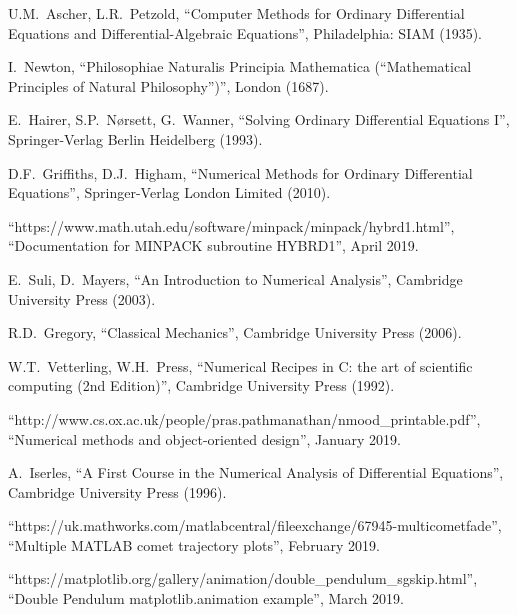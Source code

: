\documentclass[12pt, twoside]{report}
\theoremstyle{plain}
\theoremstyle{definition}
\theoremstyle{definition}
\begin{document}
\begin{thebibliography}{50}
        U.M.~Ascher, L.R.~Petzold,
        ``Computer Methods for Ordinary Differential Equations and 
        Differential-Algebraic Equations'',
        Philadelphia: SIAM (1935).

        I.~Newton,
        ``Philosophiae Naturalis Principia Mathematica (“Mathematical
        Principles of Natural Philosophy”)'',
        London (1687).

        E.~Hairer, S.P.~N{\o}rsett, G.~Wanner,
        ``Solving Ordinary Differential Equations I'',
        Springer-Verlag Berlin Heidelberg (1993).

        D.F.~Griffiths, D.J.~Higham,
        ``Numerical Methods for Ordinary Differential Equations'',
        Springer-Verlag London Limited (2010).

        ``https://www.math.utah.edu/software/minpack/minpack/hybrd1.html'', 
        ``Documentation for MINPACK subroutine HYBRD1'',
        April 2019.

        E.~Suli, D.~Mayers,
        ``An Introduction to Numerical Analysis'',
        Cambridge University Press (2003).

        R.D.~Gregory,
        ``Classical Mechanics'',
        Cambridge University Press (2006).

        W.T.~Vetterling, W.H.~Press,
        ``Numerical Recipes in C: the art of scientific computing (2nd 
        Edition)'',
        Cambridge University Press (1992).

        ``http://www.cs.ox.ac.uk/people/pras.pathmanathan/nmood\_printable.pdf'',
        ``Numerical methods and object-oriented design'',
        January 2019.

        A.~Iserles,
        ``A First Course in the Numerical Analysis of Differential Equations'',
        Cambridge University Press (1996).

        ``https://uk.mathworks.com/matlabcentral/fileexchange/67945-multicometfade'',
        ``Multiple MATLAB comet trajectory plots'',
        February 2019.

        ``https://matplotlib.org/gallery/animation/double\_pendulum\_sgskip.html'',
        ``Double Pendulum matplotlib.animation example'',
        March 2019.


\end{thebibliography}
\end{document}
